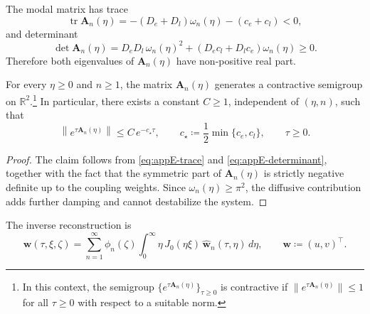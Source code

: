 The modal matrix has trace
\begin{equation}
    \operatorname{tr}\mathbf{A}_n(\eta)
    =
    -(D_e+D_l)\omega_n(\eta)-(c_e+c_l)<0,
    \label{eq:appE-trace}
\end{equation}
and determinant
\begin{equation}
    \det \mathbf{A}_n(\eta)
    =
    D_eD_l\,\omega_n(\eta)^2
    +
    (D_ec_l + D_lc_e)\omega_n(\eta)
    \ge 0.
    \label{eq:appE-determinant}
\end{equation}
Therefore both eigenvalues of \(\mathbf{A}_n(\eta)\) have non-positive real
part.

\begin{proposition}
    \label{prop:appE-modal-stability}
    For every \(\eta\ge 0\) and \(n\ge 1\), the matrix
    \(\mathbf{A}_n(\eta)\) generates a contractive semigroup on \(\mathbb{R}^2\).\footnote{
    In this context, the semigroup $\{e^{\tau \mathbf{A}_n(\eta)}\}_{\tau \geq 0}$ is contractive if $\|e^{\tau \mathbf{A}_n(\eta)}\| \leq 1$ for all $\tau \geq 0$ with respect to a suitable norm.
    } In particular, there exists a constant \(C\ge 1\), independent of
    \((\eta,n)\), such that
    \begin{equation}
        \left\|
        e^{\tau \mathbf{A}_n(\eta)}
        \right\|
        \le
        C\, e^{-c_\star \tau},
        \qquad
        c_\star \coloneqq \frac{1}{2}\min\{c_e,c_l\},
        \qquad
        \tau\ge 0.
        \label{eq:appE-modal-semigroup-bound}
    \end{equation}
\end{proposition}

\begin{proof}
    The claim follows from \eqref{eq:appE-trace} and
    \eqref{eq:appE-determinant}, together with the fact that the symmetric part of
    \(\mathbf{A}_n(\eta)\) is strictly negative definite up to the coupling
    weights. Since \(\omega_n(\eta)\ge \pi^2\), the diffusive contribution adds
    further damping and cannot destabilize the system.
\end{proof}

The inverse reconstruction is
\begin{equation}
    \mathbf{w}(\tau,\xi,\zeta)
    =
    \sum_{n=1}^{\infty}
    \phi_n(\zeta)
    \int_0^\infty
    \eta\, J_0(\eta\xi)\,
    \widehat{\mathbf{w}}_n(\tau,\eta)\, d\eta,
    \qquad
    \mathbf{w}\coloneqq (u,v)^\top.
    \label{eq:appE-inverse-reconstruction}
\end{equation}

